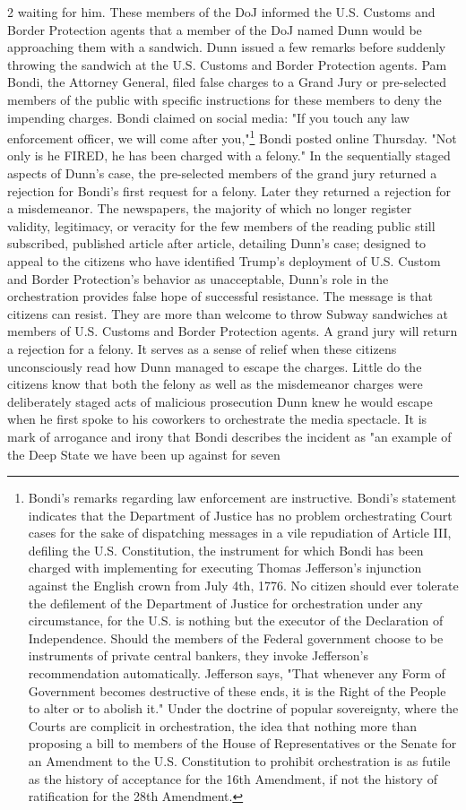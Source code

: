 \documentclass[10pt,a4paper,twoside]{article} %
\begin{document}
\begin{multicols}{2}
waiting for him. These members of the DoJ informed the U.S. Customs and Border Protection agents that a member of the DoJ named Dunn would be approaching them with a sandwich. Dunn issued a few remarks before suddenly throwing the sandwich at the U.S. Customs and Border Protection agents. Pam Bondi, the Attorney General, filed false charges to a Grand Jury or pre-selected members of the public with specific instructions for these members to deny the impending charges. Bondi claimed on social media: "If you touch any law enforcement officer, we will come after you,"\footnote{Bondi's remarks regarding law enforcement are instructive. Bondi's statement indicates that the Department of Justice has no problem orchestrating Court cases for the sake of dispatching messages in a vile repudiation of Article III, defiling the U.S. Constitution, the instrument for which Bondi has been charged with implementing for executing Thomas Jefferson's injunction against the English crown from July 4th, 1776. No citizen should ever tolerate the defilement of the Department of Justice for orchestration under any circumstance, for the U.S. is nothing but the executor of the Declaration of Independence. Should the members of the Federal government choose to be instruments of private central bankers, they invoke Jefferson's recommendation automatically. Jefferson says, "That whenever any Form of Government becomes destructive of these ends, it is the Right of the People to alter or to abolish it." Under the doctrine of popular sovereignty, where the Courts are complicit in orchestration, the idea that nothing more than proposing a bill to members of the House of Representatives or the Senate for an Amendment to the U.S. Constitution to prohibit orchestration is as futile as the history of acceptance for the 16th Amendment, if not the history of ratification for the 28th Amendment.} Bondi posted online Thursday. "Not only is he FIRED, he has been charged with a felony." In the sequentially staged aspects of Dunn's case, the pre-selected members of the grand jury returned a rejection for Bondi's first request for a felony. Later they returned a rejection for a misdemeanor. The newspapers, the majority of which no longer register validity, legitimacy, or veracity for the few members of the reading public still subscribed, published article after article, detailing Dunn's case; designed to appeal to the citizens who have identified Trump's deployment of U.S. Custom and Border Protection's behavior as unacceptable, Dunn's role in the orchestration provides false hope of successful resistance. The message is that citizens can resist. They are more than welcome to throw Subway sandwiches at members of U.S. Customs and Border Protection agents. A grand jury will return a rejection for a felony. It serves as a sense of relief when these citizens unconsciously read how Dunn managed to escape the charges. Little do the citizens know that both the felony as well as the misdemeanor charges were deliberately staged acts of malicious prosecution Dunn knew he would escape when he first spoke to his coworkers to orchestrate the media spectacle. It is mark of arrogance and irony that Bondi describes the incident as "an example of the Deep State we have been up against for seven 
\end{multicols}
\end{document}
